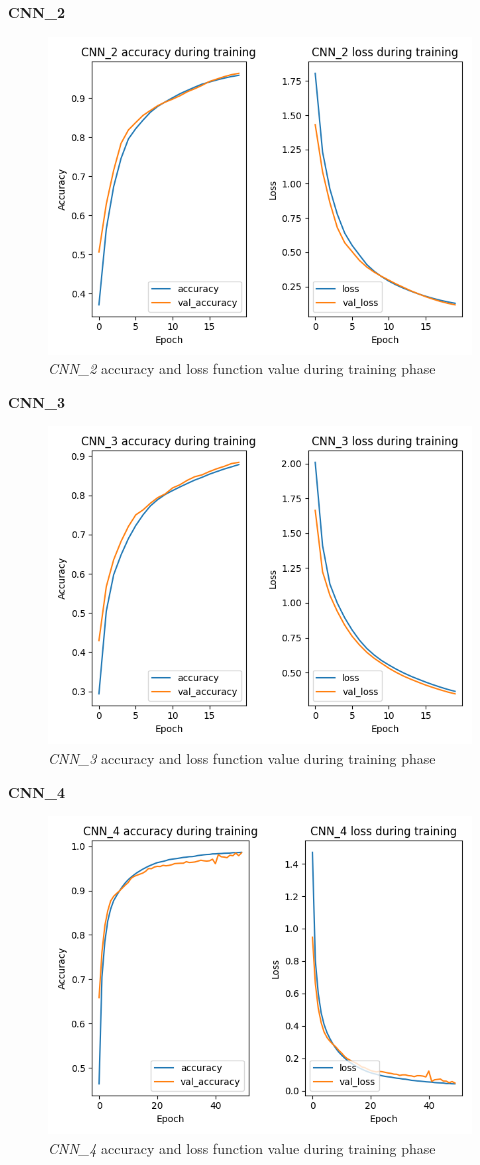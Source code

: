 \textbf{CNN\_2}

\begin{figure}[h!]
\centering
\includegraphics[width=0.68\linewidth]{../images/cnn_2_training_accuracy.png}
\caption{\emph{CNN\_2} accuracy and loss function value during training phase}
\end{figure}

\newpage

\textbf{CNN\_3}

\begin{figure}[h!]
\centering
\includegraphics[width=0.68\linewidth]{../images/cnn_3_training_accuracy.png}
\caption{\emph{CNN\_3} accuracy and loss function value during training phase}
\end{figure}

\textbf{CNN\_4}

\begin{figure}[h!]
\centering
\includegraphics[width=0.68\linewidth]{../images/cnn_4_training_accuracy.png}
\caption{\emph{CNN\_4} accuracy and loss function value during training phase}
\end{figure}

